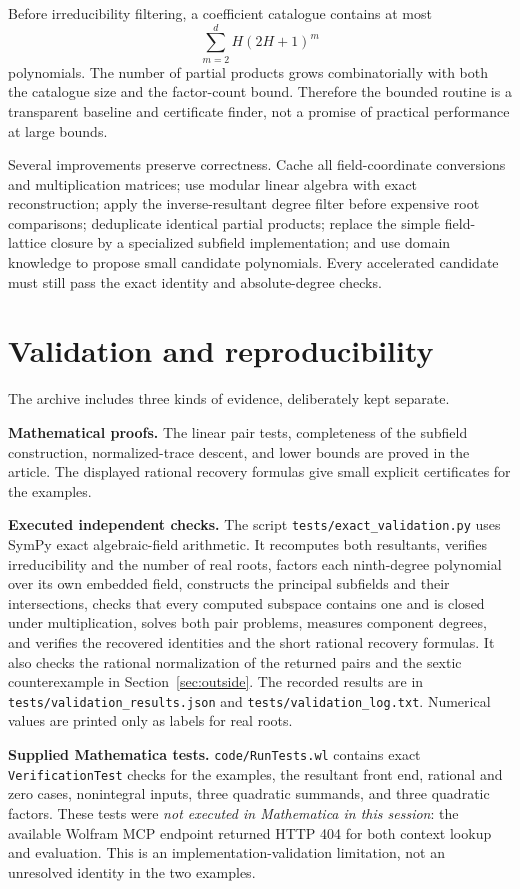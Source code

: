 \documentclass[11pt,a4paper]{article}
\newcommand{\code}[1]{\texttt{#1}}
\theoremstyle{remark}\newtheorem{remark}[theorem]{Remark}
\begin{document}
Before irreducibility filtering, a coefficient catalogue contains at most
\[
 \sum_{m=2}^{d}H(2H+1)^m
\]
polynomials. The number of partial products grows combinatorially with both the catalogue size and the factor-count bound. Therefore the bounded routine is a transparent baseline and certificate finder, not a promise of practical performance at large bounds.

Several improvements preserve correctness. Cache all field-coordinate conversions and multiplication matrices; use modular linear algebra with exact reconstruction; apply the inverse-resultant degree filter before expensive root comparisons; deduplicate identical partial products; replace the simple field-lattice closure by a specialized subfield implementation; and use domain knowledge to propose small candidate polynomials. Every accelerated candidate must still pass the exact identity and absolute-degree checks.

\section{Validation and reproducibility}
\label{sec:validation}
The archive includes three kinds of evidence, deliberately kept separate.

\textbf{Mathematical proofs.} The linear pair tests, completeness of the subfield construction, normalized-trace descent, and lower bounds are proved in the article. The displayed rational recovery formulas give small explicit certificates for the examples.

\textbf{Executed independent checks.} The script \code{tests/exact\_validation.py} uses SymPy exact algebraic-field arithmetic. It recomputes both resultants, verifies irreducibility and the number of real roots, factors each ninth-degree polynomial over its own embedded field, constructs the principal subfields and their intersections, checks that every computed subspace contains one and is closed under multiplication, solves both pair problems, measures component degrees, and verifies the recovered identities and the short rational recovery formulas. It also checks the rational normalization of the returned pairs and the sextic counterexample in Section~\ref{sec:outside}. The recorded results are in \code{tests/validation\_results.json} and \code{tests/validation\_log.txt}. Numerical values are printed only as labels for real roots.

\textbf{Supplied Mathematica tests.} \code{code/RunTests.wl} contains exact \code{VerificationTest} checks for the examples, the resultant front end, rational and zero cases, nonintegral inputs, three quadratic summands, and three quadratic factors. These tests were \emph{not executed in Mathematica in this session}: the available Wolfram MCP endpoint returned HTTP 404 for both context lookup and evaluation. This is an implementation-validation limitation, not an unresolved identity in the two examples.
\end{document}
